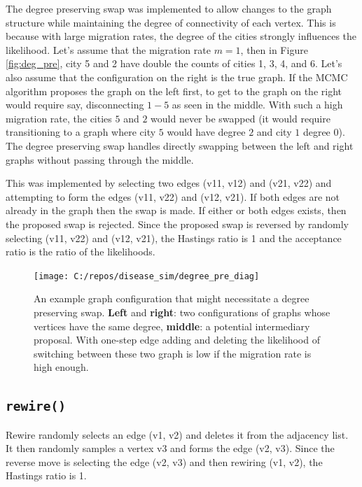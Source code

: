 \documentclass[11pt,a4paper]{article}
\numberwithin{equation}{section}
\begin{document}
The degree preserving swap was implemented to allow changes to the graph
structure while maintaining the degree of connectivity of each vertex.
This is because with large migration rates, the degree of the cities
strongly influences the likelihood. Let's assume that the migration rate
\(m = 1\), then in Figure \ref{fig:deg_pre}, city 5 and 2 have double
the counts of cities 1, 3, 4, and 6. Let's also assume that the
configuration on the right is the true graph. If the MCMC algorithm
proposes the graph on the left first, to get to the graph on the right
would require say, disconnecting \(1-5\) as seen in the middle. With
such a high migration rate, the cities \(5\) and \(2\) would never be
swapped (it would require transitioning to a graph where city \(5\)
would have degree \(2\) and city \(1\) degree 0). The degree preserving
swap handles directly swapping between the left and right graphs without
passing through the middle.

This was implemented by selecting two edges (v11, v12) and (v21, v22)
and attempting to form the edges (v11, v22) and (v12, v21). If both
edges are not already in the graph then the swap is made. If either or
both edges exists, then the proposed swap is rejected. Since the
proposed swap is reversed by randomly selecting (v11, v22) and (v12,
v21), the Hastings ratio is 1 and the acceptance ratio is the ratio of
the likelihoods.

\begin{figure}

{\centering \texttt{[image: C:/repos/disease\_sim/degree\_pre\_diag]} 

}

\caption{\label{fig:deg_pre}An example graph configuration that might necessitate a degree preserving swap. \textbf{Left} and \textbf{right}: two configurations of graphs whose vertices have the same degree, \textbf{middle}: a potential intermediary proposal. With one-step edge adding and deleting the likelihood of switching between these two graph is low if the migration rate is high enough.}\label{fig:unnamed-chunk-2}
\end{figure}

\hypertarget{rewire}{%
\subsection{\texorpdfstring{\texttt{rewire()}}{rewire()}}\label{rewire}}

Rewire randomly selects an edge (v1, v2) and deletes it from the
adjacency list. It then randomly samples a vertex v3 and forms the edge
(v2, v3). Since the reverse move is selecting the edge (v2, v3) and then
rewiring (v1, v2), the Hastings ratio is 1.
\end{document}
